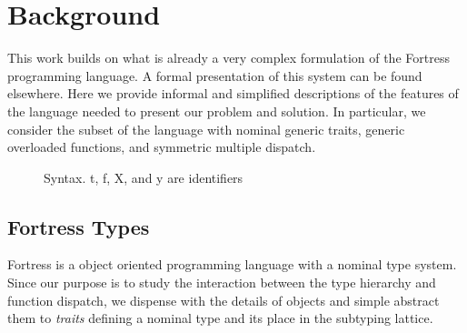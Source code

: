 \documentclass[preprint]{sigplanconf}
\newcommand{\columnWidth}{3.2in}
\newcommand{\obb}[1]{\ensuremath{\llbracket \overline{#1} \rrbracket}}
\begin{document}
\section{Background}

This work builds on what is already a very complex formulation of the Fortress programming language.
A formal presentation of this system can be found elsewhere.  Here we provide informal and simplified 
descriptions of the features of the language needed to present our problem and solution.  In particular,
we consider the subset of the language with nominal generic traits, generic overloaded functions,
and symmetric multiple dispatch.

\begin{figure}
\fbox{
\begin{minipage}{\columnWidth}
\[
\begin{array}{r c c l}
	\mbox{\footnotesize{Concrete Type}} & T & ::=  & t\obb{T} ~|~ {\tt Object} \\
	\mbox{\footnotesize{Generic Type}} & \tau & ::=  & X ~|~ t\obb{\tau} ~|~ T \\
	\mbox{\footnotesize{Type Declaration}} & d & ::= & \texttt{trait}~t\obb{V~tp} ~\texttt{extends}~\overline{t'\obb{\tau}} \\
	\mbox{\footnotesize{Variance}} & V & ::= & {\tt covariant} ~|~ {\tt invariant}  \\%
	\mbox{\footnotesize{Type Parameter}} & tp & ::= &  X ~\texttt{extends}~\overline{\tau} \\
	\mbox{\footnotesize{Function Signature}} & fn & ::= & f\obb{tp}(\overline{y : \tau}) : \tau \\		
\end{array}
\] 
\end{minipage}
} %
\caption{Syntax. t, f, X, and y are identifiers }
\label{fig:syntax}
\end{figure}

\subsection{Fortress Types}

Fortress is a object oriented programming language with a nominal type system.  Since our purpose
is to study the interaction between the type hierarchy and function dispatch, we dispense with the details
of objects and simple abstract them to {\it traits} defining a nominal type and its place in the subtyping lattice.
\end{document}

